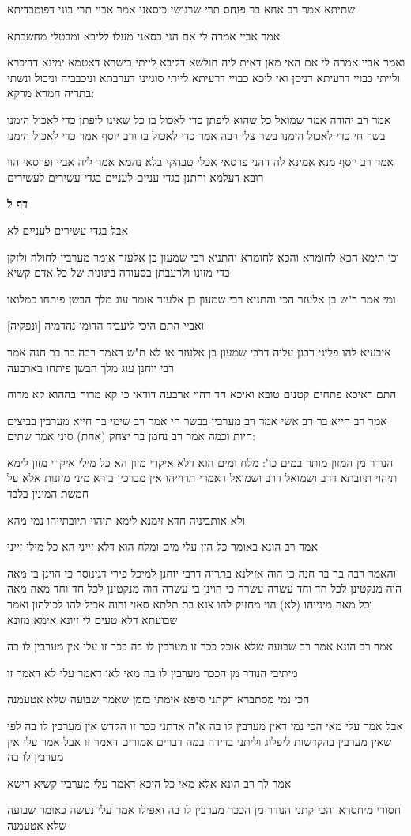 \documentclass[12pt, openany]{book}
\newcommand{\sethebfont}{
\fontsize{10.5pt}{21.0pt} \selectfont
}
\newcommand{\textblock}[1]{
{\sethebfont #1\\}	
}
\newcommand{\sectname}{}
\newcommand{\newsection}[1]{
	\addcontentsline{toc}{section}{#1}
	\renewcommand{\sectname}{#1}	
	\vspace{-\baselineskip}
	\begin{center}
		\textbf{%
\fontsize{16pt}{16pt}\selectfont
			#1}
	\end{center}
	\vspace{-\baselineskip}
	\nopagebreak
}
\begin{document}
\textblock{שתיתא אמר רב אחא בר פנחס תרי שרגושי כיסאני אמר אביי תרי בוני דפומבדיתא}
\textblock{אמר אביי אמרה לי אם הני כסאני מעלו לליבא ומבטלי מחשבתא}
\textblock{ואמר אביי אמרה לי אם האי מאן דאית ליה חולשא דליבא לייתי בישרא דאטמא ימינא דדיכרא ולייתי כבויי דרעיתא דניסן ואי ליכא כבויי דרעיתא לייתי סוגייני דערבתא וניכבביה וניכול ונשתי בתריה חמרא מרקא:}
\textblock{אמר רב יהודה אמר שמואל כל שהוא ליפתן כדי לאכול בו כל שאינו ליפתן כדי לאכול הימנו בשר חי כדי לאכול הימנו בשר צלי רבה אמר כדי לאכול בו ורב יוסף אמר כדי לאכול הימנו}
\textblock{אמר רב יוסף מנא אמינא לה דהני פרסאי אכלי טבהקי בלא נהמא אמר ליה אביי ופרסאי הוו רובא דעלמא והתנן בגדי עניים לעניים בגדי עשירים לעשירים}
\newsection{דף ל}
\textblock{אבל בגדי עשירים לעניים לא}
\textblock{וכי תימא הכא לחומרא והכא לחומרא והתניא רבי שמעון בן אלעזר אומר מערבין לחולה ולזקן כדי מזונו ולרעבתן בסעודה בינונית של כל אדם קשיא}
\textblock{ומי אמר ר"ש בן אלעזר הכי והתניא רבי שמעון בן אלעזר אומר עוג מלך הבשן פיתחו כמלואו}
\textblock{ואביי התם היכי ליעביד הדומי נהדמיה [ונפקיה]}
\textblock{איבעיא להו פליגי רבנן עליה דרבי שמעון בן אלעזר או לא ת"ש דאמר רבה בר בר חנה אמר רבי יוחנן עוג מלך הבשן פיתחו בארבעה}
\textblock{התם דאיכא פתחים קטנים טובא ואיכא חד דהוי ארבעה דודאי כי קא מרוח בההוא קא מרוח}
\textblock{אמר רב חייא בר רב אשי אמר רב מערבין בבשר חי אמר רב שימי בר חייא מערבין בביצים חיות וכמה אמר רב נחמן בר יצחק (אחת) סיני אמר שתים:}
\textblock{הנודר מן המזון מותר במים כו': מלח ומים הוא דלא איקרי מזון הא כל מילי איקרי מזון לימא תיהוי תיובתא דרב ושמואל דרב ושמואל דאמרי תרוייהו אין מברכין בורא מיני מזונות אלא על חמשת המינין בלבד}
\textblock{ולא אותביניה חדא זימנא לימא תיהוי תיובתייהו נמי מהא}
\textblock{אמר רב הונא באומר כל הזן עלי מים ומלח הוא דלא זייני הא כל מילי זייני}
\textblock{והאמר רבה בר בר חנה כי הוה אזילנא בתריה דרבי יוחנן למיכל פירי דגינוסר כי הוינן בי מאה הוה מנקטינן לכל חד וחד עשרה עשרה כי הוינן בי עשרה הוה מנקטינן לכל חד וחד מאה מאה וכל מאה מינייהו (לא) הוי מחזיק להו צנא בת תלתא סאוי והוה אכיל להו לכולהון ואמר שבועתא דלא טעים לי זיונא אימא מזונא}
\textblock{אמר רב הונא אמר רב שבועה שלא אוכל ככר זו מערבין לו בה ככר זו עלי אין מערבין לו בה}
\textblock{מיתיבי הנודר מן הככר מערבין לו בה מאי לאו דאמר עלי לא דאמר זו}
\textblock{הכי נמי מסתברא דקתני סיפא אימתי בזמן שאמר שבועה שלא אטעמנה}
\textblock{אבל אמר עלי מאי הכי נמי דאין מערבין לו בה א"ה אדתני ככר זו הקדש אין מערבין לו בה לפי שאין מערבין בהקדשות ליפלוג וליתני בדידה במה דברים אמורים דאמר זו אבל אמר עלי אין מערבין לו בה}
\textblock{אמר לך רב הונא אלא מאי כל היכא דאמר עלי מערבין קשיא רישא}
\textblock{חסורי מיחסרא והכי קתני הנודר מן הככר מערבין לו בה ואפילו אמר עלי נעשה כאומר שבועה שלא אטעמנה}
\end{document}
